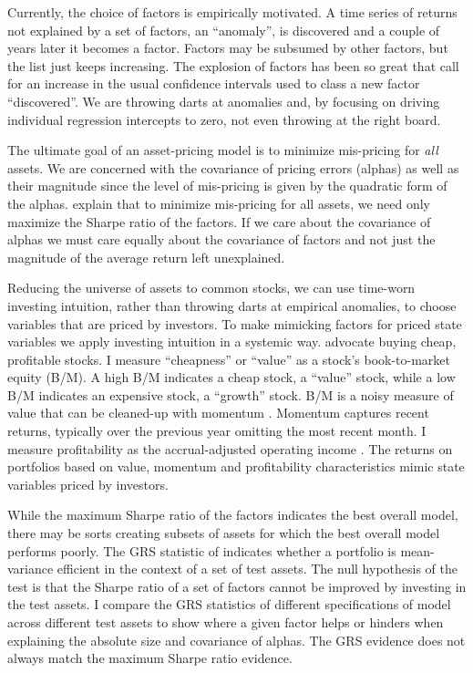 Currently, the choice of factors is empirically motivated. A time series of returns not
explained by a set of factors, an ``anomaly”, is discovered and a couple of years later it
becomes a factor. Factors may be subsumed by other factors, but the list just keeps
increasing. The explosion of factors has been so great that \textcite{harvey2016and} call
for an increase in the usual confidence intervals used to class a new factor “discovered”.
We are throwing darts at anomalies and, by focusing on driving individual regression
intercepts to zero, not even throwing at the right board.

The ultimate goal of an asset-pricing model is to minimize mis-pricing for \emph{all}
assets. We are concerned with the covariance of pricing errors (alphas) as well as their
magnitude since the level of mis-pricing is given by the quadratic form of the alphas.
\textcite{barillas2016alpha} explain that to minimize mis-pricing for all assets, we need
only maximize the Sharpe ratio of the factors. If we care about the covariance of alphas
we must care equally about the covariance of factors and not just the magnitude of the
average return left unexplained.

Reducing the universe of assets to common stocks, we can use time-worn investing
intuition, rather than throwing darts at empirical anomalies, to choose variables that are
priced by investors. To make mimicking factors for priced state variables we apply
investing intuition in a systemic way. \textcite{graham1934security} advocate buying
cheap, profitable stocks. I measure “cheapness” or “value” as a stock’s book-to-market
equity (B/M). A high B/M indicates a cheap stock, a “value” stock, while a low B/M
indicates an expensive stock, a “growth” stock. B/M is a noisy measure of value that can
be cleaned-up with momentum \parencite{kok2017facts, asness2013devil}. Momentum captures
recent returns, typically over the previous year omitting the most recent month. I measure
profitability as the accrual-adjusted operating income \parencite{ball2016accruals}. The
returns on portfolios based on value, momentum and profitability characteristics mimic
state variables priced by investors.

While the maximum Sharpe ratio of the factors indicates the best overall model, there may
be sorts creating subsets of assets for which the best overall model performs poorly. The
GRS statistic of \textcite{gibbons1989test} indicates whether a portfolio is mean-variance
efficient in the context of a set of test assets. The null hypothesis of the test is that
the Sharpe ratio of a set of factors cannot be improved by investing in the test assets. I
compare the GRS statistics of different specifications of model across different test
assets to show where a given factor helps or hinders when explaining the absolute size and
covariance of alphas. The GRS evidence does not always match the maximum Sharpe ratio
evidence.

